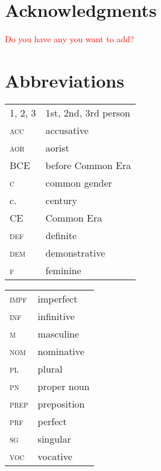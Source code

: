 \documentclass[output=paper]{langsci/langscibook}
\begin{document}
\section*{Acknowledgments}
\textcolor{red}{Do you have any you want to add?}

\section*{Abbreviations}

\begin{tabularx}{.45\textwidth}{lQ}
\textsc{1, 2, 3} & 1st, 2nd, 3rd person \\
\textsc{acc} & accusative \\
\textsc{aor} & aorist \\
BCE & before Common Era \\
\textsc{c} & common gender \\
c. & century \\
CE & Common Era \\
\textsc{def} & definite \\
\textsc{dem} & demonstrative \\
\textsc{f} & feminine \\
\end{tabularx}
\begin{tabularx}{.45\textwidth}{lQ}
\textsc{impf} & imperfect \\
\textsc{inf} & infinitive \\
\textsc{m} & masculine \\
\textsc{nom} & nominative \\
\textsc{pl} & plural \\
\textsc{pn} & proper noun \\
\textsc{prep} & preposition \\
\textsc{prf} & perfect \\
\textsc{sg} & singular \\
\textsc{voc} & vocative \\
\end{tabularx}


\sloppy
\printbibliography[heading=subbibliography,notkeyword=this] 
\end{document}
